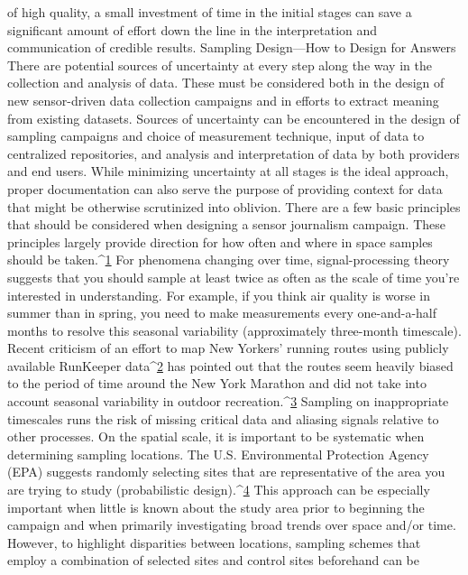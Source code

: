 of high quality, a small investment of time in the initial stages can save a
significant amount of effort down the line in the interpretation and communication
of credible results.
Sampling Design—How to Design for Answers
There are potential sources of uncertainty at every step along the way in
the collection and analysis of data. These must be considered both in the
design of new sensor-driven data collection campaigns and in efforts to
extract meaning from existing datasets. Sources of uncertainty can be
encountered in the design of sampling campaigns and choice of measurement
technique, input of data to centralized repositories, and analysis and
interpretation of data by both providers and end users. While minimizing
uncertainty at all stages is the ideal approach, proper documentation can
also serve the purpose of providing context for data that might be otherwise
scrutinized into oblivion.
There are a few basic principles that should be considered when designing a
sensor journalism campaign. These principles largely provide direction for
how often and where in space samples should be taken.^{\href{#endnotes-stauffer}{1}} For phenomena
changing over time, signal-processing theory suggests that you should sample
at least twice as often as the scale of time you're interested in understanding.
For example, if you think air quality is worse in summer than in
spring, you need to make measurements every one-and-a-half months to
resolve this seasonal variability (approximately three-month timescale).
Recent criticism of an effort to map New Yorkers' running routes using
publicly available RunKeeper data^{\href{#endnotes-stauffer}{2}} has pointed out that the routes seem
heavily biased to the period of time around the New York Marathon and did not take into account seasonal variability in outdoor recreation.^{\href{#endnotes-stauffer}{3}} Sampling
on inappropriate timescales runs the risk of missing critical data and aliasing
signals relative to other processes.
On the spatial scale, it is important to be systematic when determining sampling
locations. The U.S. Environmental Protection Agency (EPA) suggests
randomly selecting sites that are representative of the area you are trying
to study (probabilistic design).^{\href{#endnotes-stauffer}{4}} This approach can be especially important
when little is known about the study area prior to beginning the campaign
and when primarily investigating broad trends over space and/or time.
However, to highlight disparities between locations, sampling schemes that
employ a combination of selected sites and control sites beforehand can be
